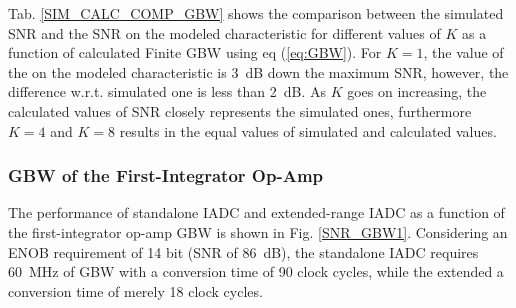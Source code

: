 Tab. \ref{SIM_CALC_COMP_GBW} shows the comparison between the simulated SNR and the SNR on the modeled characteristic for different values of $K$ as a function of calculated Finite GBW using eq (\ref{eq:GBW}). For $K=1$, the value of the on the modeled characteristic is 3~dB down the maximum SNR, however, the difference w.r.t. simulated one is less than 2~dB. As $K$ goes on increasing, the calculated values of SNR closely represents the simulated ones, furthermore $K=4$ and $K=8$ results in the equal values of simulated and calculated values.


\subsubsection{GBW of the First-Integrator Op-Amp}
The performance of standalone IADC and extended-range IADC as a function of the first-integrator op-amp GBW is shown in Fig. \ref{SNR_GBW1}. Considering an ENOB requirement of 14 bit (SNR of 86~dB), the standalone IADC requires 60~MHz of GBW with a conversion time of 90 clock cycles, while the extended a conversion time of merely 18 clock cycles.

